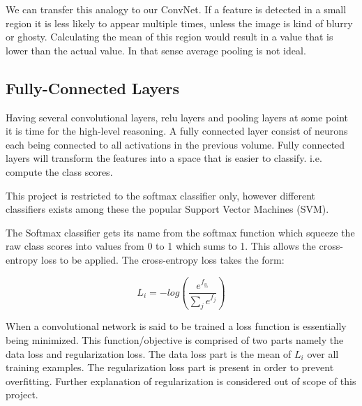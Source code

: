 We can transfer this analogy to our ConvNet. If a feature is detected in a small region it is less likely to appear multiple times, unless the image is kind of blurry or ghosty. Calculating the mean of this region would result in a value that is lower than the actual value. In that sense average pooling is not ideal.


\subsection{Fully-Connected Layers} %
\label{sub:fc_layers}

Having several convolutional layers, relu layers and pooling layers at some point it is time for the high-level reasoning. A fully connected layer consist of neurons each being connected to all activations in the previous volume. Fully connected layers will transform the features into a space that is easier to classify. i.e. compute the class scores. 

This project is restricted to the softmax classifier only, however different classifiers exists among these the popular Support Vector Machines (SVM).

The Softmax classifier gets its name from the softmax function which squeeze the raw class scores into values from 0 to 1 which sums to 1. This allows the cross-entropy loss to be applied. The cross-entropy loss takes the form:

$$ L_i = -log\left(\frac{e^{f_{y_i}}}{\sum_{j}{e^{f_j}}}\right)$$

When a convolutional network is said to be trained a loss function is essentially being minimized. This function/objective is comprised of two parts namely the data loss and regularization loss. The data loss part is the mean of $L_i$ over all training examples. The regularization loss part is present in order to prevent overfitting. Further explanation of regularization is considered out of scope of this project.


